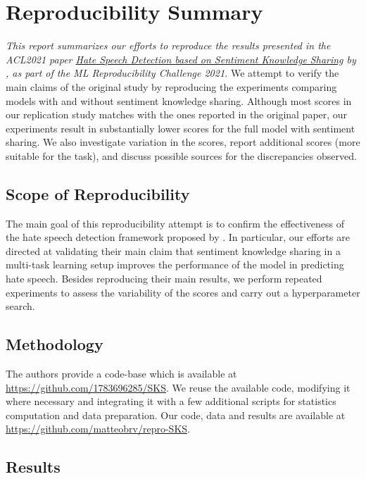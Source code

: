 \section{Reproducibility Summary}

\textit{This report summarizes our efforts to reproduce the results presented in the ACL2021 paper \href{https://aclanthology.org/2021.acl-long.556/}{Hate Speech Detection based on Sentiment Knowledge Sharing} by \citeauthor{original:zhou} \cite{original:zhou}, as part of the ML Reproducibility Challenge 2021.}
We attempt to verify the main claims of the original study
by reproducing the experiments comparing models
with and without sentiment knowledge sharing.
Although most scores in our replication study matches with the
ones reported in the original paper,
our experiments result in substantially lower scores
for the full model with sentiment sharing.
We also investigate variation in the scores,
report additional scores (more suitable for the task),
and discuss possible sources for the discrepancies observed.


\subsection{Scope of Reproducibility}

The main goal of this reproducibility attempt is to confirm the effectiveness of the hate speech detection framework proposed by \citeauthor{original:zhou} \cite{original:zhou}. In particular, our efforts are directed at validating their main claim that sentiment knowledge sharing in a multi-task learning setup improves the performance of the model in predicting hate speech. Besides reproducing their main results, we perform repeated experiments to assess the variability of the scores and carry out a hyperparameter search.


\subsection{Methodology}

The authors provide a code-base which is available at \url{https://github.com/1783696285/SKS}. We reuse the available code, modifying it where necessary and integrating it with a few additional scripts for statistics computation and data preparation. Our code, data and results are available at 
\url{https://github.com/matteobrv/repro-SKS}.


\subsection{Results}

